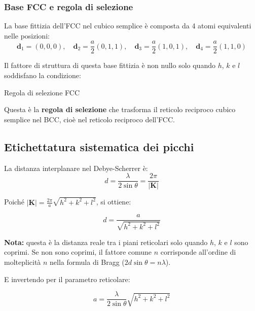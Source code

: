 \subsubsection{Base FCC e regola di selezione}

La base fittizia dell'FCC nel cubico semplice è composta da 4 atomi equivalenti nelle posizioni:
\begin{equation}
\mathbf{d}_1 = (0, 0, 0), \quad \mathbf{d}_2 = \frac{a}{2}(0, 1, 1), \quad \mathbf{d}_3 = \frac{a}{2}(1, 0, 1), \quad \mathbf{d}_4 = \frac{a}{2}(1, 1, 0)
\end{equation}

Il fattore di struttura di questa base fittizia è non nullo solo quando $h$, $k$ e $l$ soddisfano la condizione:

\begin{equazione}{Regola di selezione FCC}
\end{equazione}

Questa è la \textbf{regola di selezione} che trasforma il reticolo reciproco cubico semplice nel BCC, cioè nel reticolo reciproco dell'FCC.

\subsection{Etichettatura sistematica dei picchi}



La distanza interplanare nel Debye-Scherrer è:
\begin{equation}
d = \frac{\lambda}{2\sin\theta} = \frac{2\pi}{|\mathbf{K}|}
\end{equation}

Poiché $|\mathbf{K}| = \frac{2\pi}{a}\sqrt{h^2 + k^2 + l^2}$, si ottiene:

\begin{equation}
\boxed{d = \frac{a}{\sqrt{h^2 + k^2 + l^2}}}
\end{equation}

\begin{nota}
\textbf{Nota:} questa è la distanza reale tra i piani reticolari solo quando $h$, $k$ e $l$ sono coprimi. Se non sono coprimi, il fattore comune $n$ corrisponde all'ordine di molteplicità $n$ nella formula di Bragg ($2d\sin\theta = n\lambda$).
\end{nota}

E invertendo per il parametro reticolare:

\begin{equation}
\boxed{a = \frac{\lambda}{2\sin\theta}\sqrt{h^2 + k^2 + l^2}}
\end{equation}

